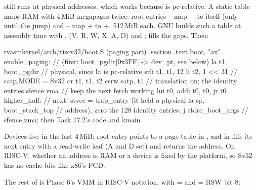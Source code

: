 \documentclass[11pt,a4paper]{article}
\begin{document}
 still runs at physical addresses, which works because  is pc-relative. A static table maps
RAM with 4\,MiB megapages twice: root entries -- map + to itself (only until
the jump) and -- map + to +, 512\,MiB each. GNU 
builds such a table at assembly time with ,  (V, R, W, X, A, D) and
;  fills the gaps. Then:

\begin{lst}{rvasm}{kernel/arch/riscv32/boot.S (paging part)}
    .section .text.boot, "ax"
enable_paging:                          // (first: boot_pgdir[0x3FF] -> dev_pt, see below)
    la    t1, boot_pgdir                // physical, since la is pc-relative
    srli  t1, t1, 12
    li    t2, 1 << 31                   // satp.MODE = Sv32
    or    t1, t1, t2
    csrw  satp, t1                      // translation on; the identity entries
    sfence.vma                          //   keep the next fetch working
    lui   t0, %
    addi  t0, t0, %
    jr    t0
higher_half:                            // next: stvec = trap_entry (it held a physical
    la    sp, boot_stack_top            //   address), zero the 128 identity entries,
    j     store_boot_args               //   sfence.vma; then Task 17.2's code and kmain
\end{lst}

Devices live in the last 4\,MiB: root entry  points to a page table  in , and
 in  fills its next entry with a read-write leaf (A and D set) and returns the address. On
RISC-V, whether an address is RAM or a device is fixed by the platform, so Sv32 has no cache bits like x86's PCD.

The rest of  is Phase 6's VMM in RISC-V notation, with  = 
and  = RSW bit 8:
\end{document}
